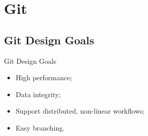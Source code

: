 \documentclass{beamer}
\begin{document}
\section{Git}

\subsection{Git Design Goals}
\begin{frame}{Git Design Goals}
  \begin{itemize}
    \item High performance; 
    \item Data integrity;
    \item Support distributed, non-linear workflows;
    \item Easy branching.
  \end{itemize}
\end{frame}
\end{document}
